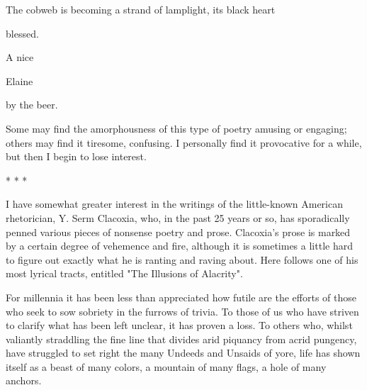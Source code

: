                                The cobweb is becoming a strand of
               lamplight, its black heart

                                 blessed.


                        A nice

                        Elaine

                        by the beer.

Some may find the amorphousness of this type of poetry amusing or engaging; others
may find it tiresome, confusing. I personally find it provocative for a while, but then I
begin to lose interest.

                                            *   *   *

I have somewhat greater interest in the writings of the little-known American rhetorician,
Y. Serm Clacoxia, who, in the past 25 years or so, has sporadically penned various pieces
of nonsense poetry and prose. Clacoxia's prose is marked by a certain degree of
vehemence and fire, although it is sometimes a little hard to figure out exactly what he is
ranting and raving about. Here follows one of his most lyrical tracts, entitled "The
Illusions of Alacrity".

   For millennia it has been less than appreciated how futile are the efforts of those
   who seek to sow sobriety in the furrows of trivia. To those of us who have striven
   to clarify what has been left unclear, it has proven a loss. To others who, whilst
   valiantly straddling the fine line that divides arid piquancy from acrid pungency,
   have struggled to set right the many Undeeds and Unsaids of yore, life has shown
   itself as a beast of many colors, a mountain of many flags, a hole of many anchors.





